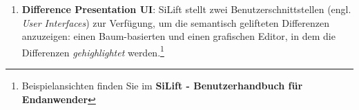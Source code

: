 \begin{enumerate}
\item \textbf{Difference Presentation UI}:
SiLift stellt zwei Benutzerschnittstellen (engl. \textit{User Interfaces}) zur Verfügung, um die semantisch gelifteten Differenzen anzuzeigen: 
einen Baum-basierten  und einen grafischen Editor, in dem die Differenzen \textit{gehighlightet} werden.\footnote{Beispielansichten finden Sie im \textbf{SiLift - Benutzerhandbuch für Endanwender}}
\end{enumerate}
